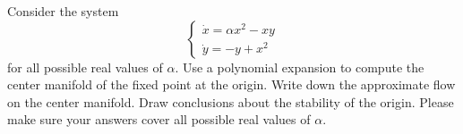 \documentclass[12pt]{report}
\begin{document}
\newpage



\begin{problem}
    Consider the system 
\begin{equation}
\left\{\begin{array}{l}
\dot x= \alpha x^2 -xy \\
\dot y = -y + x^2 
\end{array}\right.
\end{equation}
for all possible real values of  $\alpha$.  Use a polynomial expansion to compute the center manifold of the fixed point at the origin.  Write down the approximate flow on the center manifold.  Draw conclusions about the stability of the origin.  Please make sure your answers cover all possible real values of  $\alpha$.
\end{problem}
\end{document}
